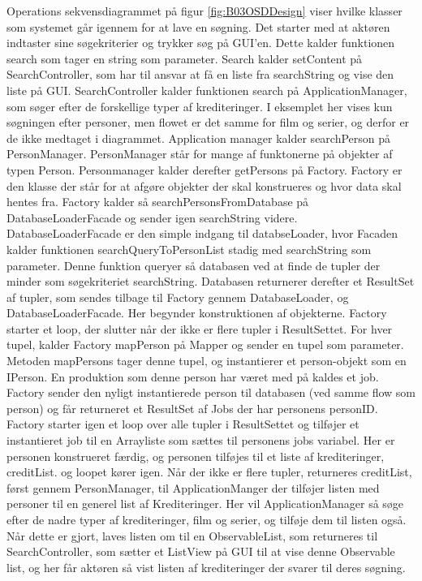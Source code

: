 Operations sekvensdiagrammet på figur \ref{fig:B03OSDDesign} viser hvilke klasser som systemet går igennem for at lave en søgning. Det starter med at aktøren indtaster sine søgekriterier og trykker søg på GUI'en. Dette kalder funktionen search som tager en string som parameter. Search kalder setContent på SearchController, som har til ansvar at få en liste fra searchString og vise den liste på GUI. SearchController kalder funktionen search på ApplicationManager, som søger efter de forskellige typer af krediteringer. I eksemplet her vises kun søgningen efter personer, men flowet er det samme for film og serier, og derfor er de ikke medtaget i diagrammet. Application manager kalder searchPerson på PersonManager. PersonManager står for mange af funktonerne på objekter af typen Person. Personmanager kalder derefter getPersons på Factory. Factory er den klasse der står for at afgøre objekter der skal konstrueres og hvor data skal hentes fra. Factory kalder så searchPersonsFromDatabase på DatabaseLoaderFacade og sender igen searchString videre. DatabaseLoaderFacade er den simple indgang til databseLoader, hvor Facaden kalder funktionen searchQueryToPersonList stadig med searchString som parameter. Denne funktion queryer så databasen ved at finde de tupler der minder som søgekriteriet searchString. Databasen returnerer derefter et ResultSet af tupler, som sendes tilbage til Factory gennem DatabaseLoader, og DatabaseLoaderFacade. Her begynder konstruktionen af objekterne. Factory starter et loop, der slutter når der ikke er flere tupler i ResultSettet. For hver tupel, kalder Factory mapPerson på Mapper og sender en tupel som parameter. Metoden mapPersons tager denne tupel, og instantierer et person-objekt som en IPerson. En produktion som denne person har været med på kaldes et job. Factory sender den nyligt instantierede person til databasen (ved samme flow som person) og får returneret et ResultSet af Jobs der har personens personID. Factory starter igen et loop over alle tupler i ResultSettet og tilføjer et instantieret job til en Arrayliste som sættes til personens jobs variabel. Her er personen konstrueret færdig, og personen tilføjes til et liste af krediteringer, creditList. og loopet kører igen. Når der ikke er flere tupler, returneres creditList, først gennem PersonManager, til ApplicationManger der tilføjer listen med personer til en generel list af Krediteringer. Her vil ApplicationManager så søge efter de nadre typer af krediteringer, film og serier, og tilføje dem til listen også. Når dette er gjort, laves listen om til en ObservableList, som returneres til SearchController, som sætter et ListView på GUI til at vise denne Observable list, og her får aktøren så vist listen af krediteringer der svarer til deres søgning.
